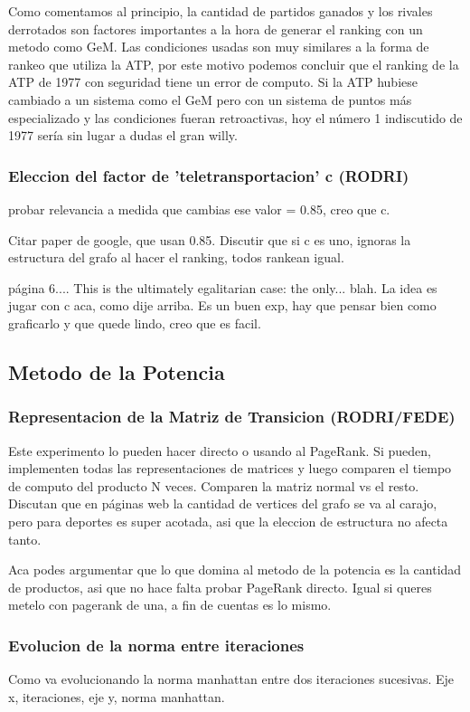 Como comentamos al principio, la cantidad de partidos ganados y los rivales derrotados son factores importantes a la hora de generar el ranking con un metodo como GeM. Las condiciones usadas son muy similares a la forma de rankeo que utiliza la ATP, por este motivo podemos concluir que el ranking de la ATP de 1977 con seguridad tiene un error de computo. Si la ATP hubiese cambiado a un sistema como el GeM pero con un sistema de puntos más especializado y las condiciones fueran retroactivas, hoy el número 1 indiscutido de 1977 sería sin lugar a dudas el gran willy.

\subsubsection{Eleccion del factor de 'teletransportacion' c (RODRI)}
probar relevancia a medida que cambias ese valor = 0.85, creo que c.

Citar paper de google, que usan 0.85. Discutir que si c es uno, ignoras la estructura del grafo al hacer el ranking, todos rankean igual.

página 6.... This is the ultimately egalitarian case: the only... blah. La idea es jugar con c aca, como dije arriba. Es un buen exp, hay que pensar bien como graficarlo y que quede lindo, creo que es facil.

\subsection{Metodo de la Potencia}

\subsubsection{Representacion de la Matriz de Transicion (RODRI/FEDE)}
Este experimento lo pueden hacer directo o usando al PageRank. Si pueden, implementen todas las representaciones de matrices y luego comparen el tiempo de computo del producto N veces. Comparen la matriz normal vs el resto. Discutan que en páginas web la cantidad de vertices del grafo se va al carajo, pero para deportes es super acotada, asi que la eleccion de estructura no afecta tanto.

Aca podes argumentar que lo que domina al metodo de la potencia es la cantidad de productos, asi que no hace falta probar PageRank directo. Igual si queres metelo con pagerank de una, a fin de cuentas es lo mismo.

\subsubsection{Evolucion de la norma entre iteraciones}
Como va evolucionando la norma manhattan entre dos iteraciones sucesivas. Eje x, iteraciones, eje y, norma manhattan.

